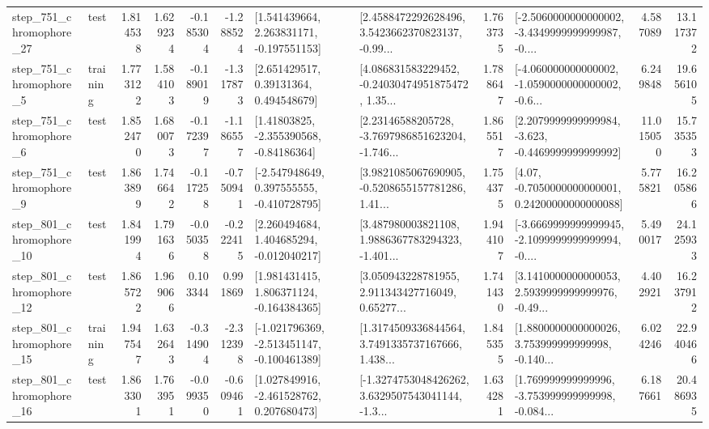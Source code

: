 \begin{tabular}{llrrrrllrlrr}
  step\_751\_chromophore\_27 &      test &      1.814538 &    1.629234 &     -0.185304 & -1.288524 &    [1.541439664, 2.263831171, -0.197551153] &  [2.4588472292628496, 3.5423662370823137, -0.99... &       1.763735 &  [-2.5060000000000002, -3.4349999999999987, -0.... &            4.587089 &         13.117372 \\
   step\_751\_chromophore\_5 &  training &      1.773122 &    1.584103 &     -0.189019 & -1.317873 &      [2.651429517, 0.39131364, 0.494548679] &  [4.086831583229452, -0.24030474951875472, 1.35... &       1.788647 &  [-4.060000000000002, -1.0590000000000002, -0.6... &            6.249848 &         19.656105 \\
   step\_751\_chromophore\_6 &      test &      1.852470 &    1.680073 &     -0.172397 & -1.186557 &     [1.41803825, -2.355390568, -0.84186364] &  [2.23146588205728, -3.7697986851623204, -1.746... &       1.865517 &  [2.2079999999999984, -3.623, -0.4469999999999992] &           11.015050 &         15.735353 \\
   step\_751\_chromophore\_9 &      test &      1.863899 &    1.746642 &     -0.117258 & -0.750941 &   [-2.547948649, 0.397555555, -0.410728795] &  [3.9821085067690905, -0.5208655157781286, 1.41... &       1.754375 &   [4.07, -0.7050000000000001, 0.24200000000000088] &            5.775821 &         16.205866 \\
  step\_801\_chromophore\_10 &      test &      1.841994 &    1.791636 &     -0.050358 & -0.222415 &    [2.260494684, 1.404685294, -0.012040217] &  [3.487980003821108, 1.9886367783294323, -1.401... &       1.944107 &  [-3.6669999999999945, -2.1099999999999994, -0.... &            5.490017 &         24.125933 \\
  step\_801\_chromophore\_12 &      test &      1.865722 &    1.969066 &      0.103344 &  0.991869 &    [1.981431415, 1.806371124, -0.164384365] &  [3.050943228781955, 2.911343427716049, 0.65277... &       1.741430 &  [3.1410000000000053, 2.5939999999999976, -0.49... &            4.402921 &         16.237912 \\
  step\_801\_chromophore\_15 &  training &      1.947547 &    1.632643 &     -0.314904 & -2.312398 &  [-1.021796369, -2.513451147, -0.100461389] &  [1.3174509336844564, 3.7491335737167666, 1.438... &       1.845355 &  [1.8800000000000026, 3.753999999999998, -0.140... &            6.024246 &         22.940466 \\
  step\_801\_chromophore\_16 &      test &      1.863301 &    1.763951 &     -0.099350 & -0.609461 &    [1.027849916, -2.461528762, 0.207680473] &  [-1.3274753048426262, 3.6329507543041144, -1.3... &       1.634281 &  [1.769999999999996, -3.753999999999998, -0.084... &            6.187661 &         20.486935 \\

\end{tabular}
